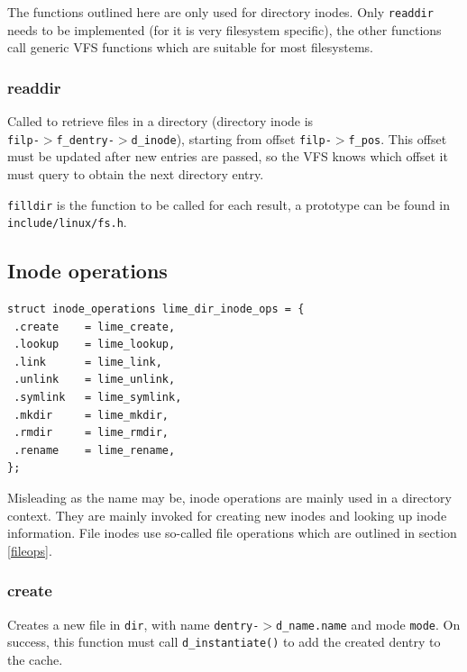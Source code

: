 The functions outlined here are only used for directory inodes. Only \texttt{readdir} needs to be implemented (for it is very filesystem specific), the other functions call generic VFS functions which are suitable for most filesystems.

\subsubsection{readdir}


Called to retrieve files in a directory (directory inode is \\
\texttt{filp-$>$f\_dentry-$>$d\_inode}), starting from offset \texttt{filp-$>$f\_pos}. This offset must be updated after new entries are passed, so the VFS knows which offset it must query to obtain the next directory entry.

\texttt{filldir} is the function to be called for each result, a prototype can be found in \texttt{include/linux/fs.h}.

\subsection{Inode operations}
\label{inodeops}

\begin{verbatim}
struct inode_operations lime_dir_inode_ops = {
 .create    = lime_create,
 .lookup    = lime_lookup,
 .link      = lime_link,
 .unlink    = lime_unlink,
 .symlink   = lime_symlink,
 .mkdir     = lime_mkdir,
 .rmdir     = lime_rmdir,
 .rename    = lime_rename,
};
\end{verbatim}
 
Misleading as the name may be, inode operations are mainly used in a directory context. They are mainly invoked for creating new inodes and looking up inode information. File inodes use so-called file operations which are outlined in section \ref{fileops}.

\subsubsection{create}


Creates a new file in \texttt{dir}, with name \texttt{dentry-$>$d\_name.name} and mode \texttt{mode}. On success, this function must call \texttt{d\_instantiate()} to add the created dentry to the cache.


